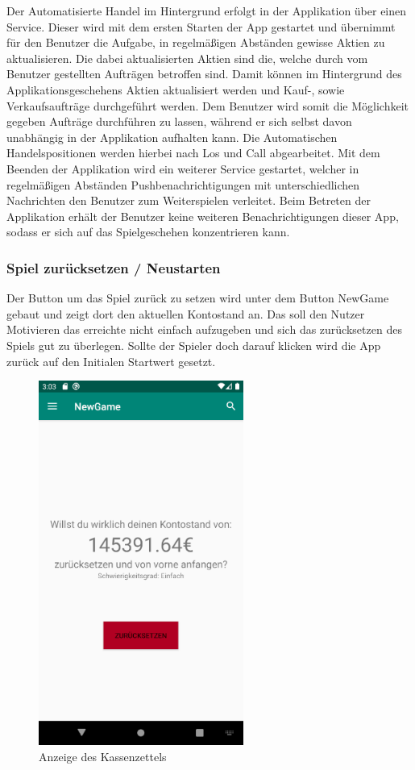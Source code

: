 \documentclass[10pt]{scrartcl}
\begin{document}
Der Automatisierte Handel im Hintergrund erfolgt in der Applikation über einen Service. Dieser wird mit dem ersten Starten der App gestartet und übernimmt für den Benutzer die Aufgabe, in regelmäßigen Abständen gewisse Aktien zu aktualisieren. Die dabei aktualisierten Aktien sind die, welche durch vom Benutzer gestellten Aufträgen betroffen sind. Damit können im Hintergrund des Applikationsgeschehens Aktien aktualisiert werden und Kauf-, sowie Verkaufsaufträge durchgeführt werden. Dem Benutzer wird somit die Möglichkeit gegeben Aufträge durchführen zu lassen, während er sich selbst davon unabhängig in der Applikation aufhalten kann. Die Automatischen Handelspositionen werden hierbei nach Los und Call abgearbeitet.
Mit dem Beenden der Applikation wird ein weiterer Service gestartet, welcher in regelmäßigen Abständen Pushbenachrichtigungen mit unterschiedlichen Nachrichten den Benutzer zum Weiterspielen verleitet. Beim Betreten der Applikation erhält der Benutzer keine weiteren Benachrichtigungen dieser App, sodass er sich auf das Spielgeschehen konzentrieren kann.

\subsubsection{Spiel zurücksetzen / Neustarten}
Der Button um das Spiel zurück zu setzen wird unter dem Button NewGame gebaut und zeigt dort den aktuellen Kontostand an. Das soll den Nutzer Motivieren das erreichte nicht einfach aufzugeben und sich das zurücksetzen des Spiels gut zu überlegen. Sollte der Spieler doch darauf klicken wird die App zurück auf den Initialen Startwert gesetzt.

\begin{figure}[H]
	\centering
	\includegraphics[width=0.6\textwidth]{Bilder/Prsi/newGame.png}
	\caption{Anzeige des Kassenzettels}
\end{figure}
\end{document}
